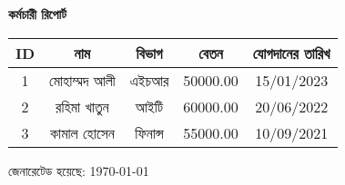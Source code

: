 ﻿\documentclass[a4paper,12pt]{article}
\begin{document}
\begin{center}
    {\Large \textbf{কর্মচারী রিপোর্ট}} \\
    \vspace{0.5cm}
\end{center}

\begin{tabular}{|c|c|c|c|c|}
    \hline
    \textbf{ID} & \textbf{নাম} & \textbf{বিভাগ} & \textbf{বেতন} & \textbf{যোগদানের তারিখ} \\ \hline
    1 & মোহাম্মদ আলী & এইচআর & 50000.00 & 15/01/2023 \\ \hline
    2 & রহিমা খাতুন & আইটি & 60000.00 & 20/06/2022 \\ \hline
    3 & কামাল হোসেন & ফিনান্স & 55000.00 & 10/09/2021 \\ \hline
\end{tabular}

\vspace{1cm}

\begin{center}
    জেনারেটেড হয়েছে: \today\ \currenttime
\end{center}
\end{document}
